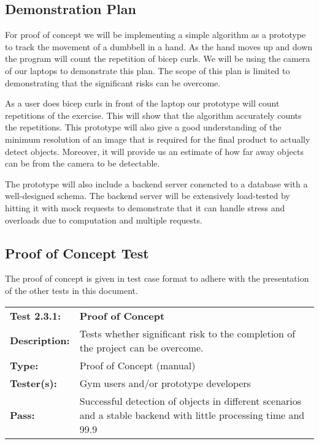 \documentclass{article}
\newenvironment{testcase}
    {
    \begin{center}
    \begin{mdframed}[
        userdefinedwidth=15.5cm,
        leftmargin=1cm,
        rightmargin=1cm
        ]
    \begin{tabular}{p{2.5cm} p{9cm}}
    }
    {
    \end{tabular}
    \end{mdframed}
    \end{center}
    }
\newcommand{\tctit}[2]{\textbf{#1} & \textbf{#2}}
\newcommand{\tcdesc}{\textbf{Description:}}
\newcommand{\tctype}{\textbf{Type:}}
\newcommand{\testers}{\textbf{Tester(s):}}
\newcommand{\tcpass}{\textbf{Pass:}}
\begin{document}
\subsection{Demonstration Plan}
For proof of concept we will be implementing a simple algorithm as a prototype to track the movement of a dumbbell in a hand. As the hand moves up and down the program will count the repetition of bicep curls. We will be using the camera of our laptops to demonstrate this plan. The scope of this plan is limited to demonstrating that the significant risks can be overcome. 

As a user does bicep curls in front of the laptop our prototype will count repetitions of the exercise. This will show that the algorithm accurately counts the repetitions. This prototype will also give a good understanding of the minimum resolution of an image that is required for the final product to actually detect objects. Moreover, it will provide us an estimate of how far away objects can be from the camera to be detectable.

The prototype will also include a backend server conencted to a database with a well-designed schema. The backend server will be extensively load-tested by hitting it with mock requests to demonstrate that it can handle stress and overloads due to computation and multiple requests.

\subsection{Proof of Concept Test}
The proof of concept is given in test case format to adhere with the presentation of the other tests in this document.
\begingroup
\begin{testcase}
    \tctit{Test 2.3.1:}{Proof of Concept} \\
    \tcdesc & Tests whether significant risk to the completion of the project can be overcome.\\
    \tctype & Proof of Concept (manual)\\
    \testers & Gym users and/or prototype developers \\
    \tcpass & Successful detection of objects in different scenarios and a stable backend with little processing time and 99.9%
\end{testcase}
\endgroup

\newpage
\end{document}
